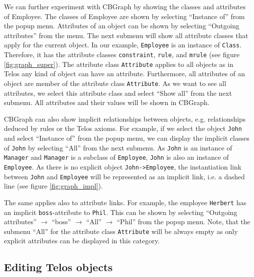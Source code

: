 We can further experiment with CBGraph by showing
the classes and attributes of Employee. The classes of Employee are
shown by selecting ``Instance of'' from the popup menu.
Attributes of an object can be shown by selecting ``Outgoing attributes''
from the menu. The next submenu will show all attribute classes that apply
for the current object. In our example, {\tt Employee} is an instance of
{\tt Class}. Therefore, it has the attribute classes {\tt constraint}, {\tt rule},
and {\tt mrule} (see figure \ref{fig:graph_super}). The attribute class {\tt Attribute} applies to all objects
as in Telos any kind of object can have an attribute. Furthermore, all attributes
of an object are member of the attribute class {\tt Attribute}. As we want
to see all attributes, we select this attribute class and select ``Show all''
from the next submenu. All attributes and their values will be shown
in CBGraph.


CBGraph can also show implicit relationships between objects,
e.g. relationships deduced by rules or the Telos axioms.
For example, if we select the object {\tt John} and select ``Instance of''
from the popup menu, we can display the implicit classes of {\tt John}
by selecting ``All'' from the next submenu. As {\tt John} is an instance of
{\tt Manager} and {\tt Manager} is a subclass of {\tt Employee}, {\tt John} is also an instance
of {\tt Employee}. As there is no explicit object \verb+John->Employee+,
the instantiation link between {\tt John} and {\tt Employee} will be represented as
an implicit link, i.e. a dashed line (see figure \ref{fig:graph_impl}).

The same applies also to attribute links. For example, the employee {\tt Herbert}
has an implicit {\tt boss}-attribute to {\tt Phil}. This can be shown by selecting
``Outgoing attributes'' $\rightarrow$ ``boss'' $\rightarrow$ ``All'' $\rightarrow$ ``Phil'' from the
popup menu. Note, that the submenu ``All'' for the attribute class {\tt Attribute}
will be always empty as only explicit attributes can be displayed in this category.


\subsection{Editing Telos objects}



